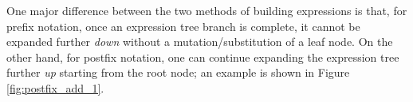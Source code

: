 \documentclass[runningheads]{llncs}
\begin{document}
\par One major difference between the two methods of building expressions is that, for prefix notation, once an expression tree branch is complete, it cannot be expanded further \emph{down} without a mutation/substitution of a leaf node. On the other hand, for postfix notation, one can continue expanding the expression tree further \emph{up} starting from the root node; an example is shown in Figure \ref{fig:postfix_add_1}.

\begin{figure}
    \begin{subfigure}[b]{0.51\textwidth}
        \centering
\end{subfigure}
\end{figure}
\end{document}

